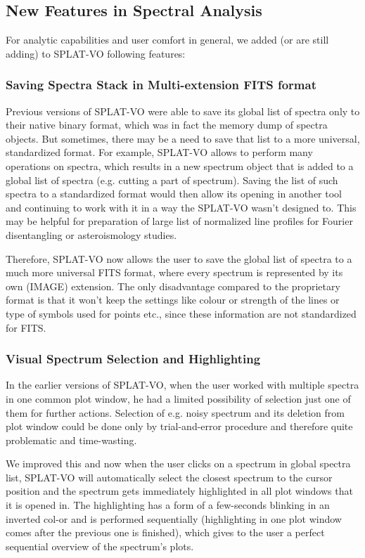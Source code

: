 \documentclass[final,authoryear,5p,times,twocolumn]{elsarticle}
\begin{document}
\subsection{New Features in Spectral Analysis}
\label{davids_functions}
For analytic capabilities and user comfort in general, we added (or
are still adding) to SPLAT-VO following features:

\subsubsection{Saving Spectra Stack in Multi-extension FITS format}

Previous versions of SPLAT-VO were able to save its global list of spectra only to
their native binary format, which was in fact the memory dump of spectra
objects. But sometimes, there may be a need to save that list to a more
universal, standardized format. For example, SPLAT-VO allows to perform many
operations on spectra, which results in a new spectrum object that is added to
a global list of spectra (e.g. cutting a part of spectrum). Saving the list of
such spectra to a standardized format would then allow its opening in another
tool and continuing to work with it in a way the SPLAT-VO wasn't designed to.
This may be helpful for preparation of large list of normalized line profiles
for Fourier disentangling or asteroismology studies.

Therefore, SPLAT-VO now allows the user to save the global list of spectra to a
much more universal FITS format, where every spectrum  is represented by its
own (IMAGE) extension.  The only disadvantage compared to the proprietary
format is that it won't keep the settings like colour or strength of the lines
or type of symbols used for points etc., since these information  are not
standardized for FITS.


\subsubsection{Visual Spectrum Selection and Highlighting}

In the earlier versions of SPLAT-VO, when the user worked with multiple
spectra in one common plot window, he  had a limited possibility of
selection just one of them for further actions. Selection of e.g. noisy
spectrum and its deletion from plot window could be done only by
trial-and-error procedure and therefore quite problematic and time-wasting.

We improved this and now when the user clicks on a spectrum in global spectra
list, SPLAT-VO will automatically select the closest spectrum to the cursor
position and  the spectrum gets immediately highlighted in all plot windows
that it is opened in. The highlighting has a form of a few-seconds blinking in
an inverted col-or and is performed sequentially (highlighting in one plot
window comes after the previous one is finished), which gives to the user a
perfect sequential overview of the spectrum's plots.
\end{document}
